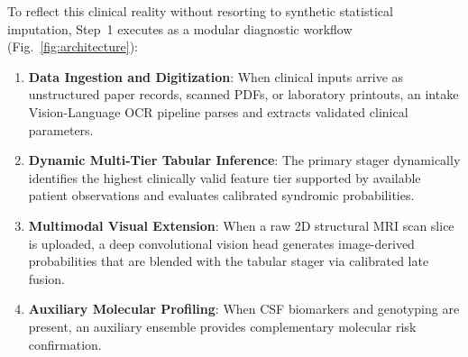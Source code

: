 To reflect this clinical reality without resorting to synthetic statistical imputation, Step~1 executes as a modular diagnostic workflow (Fig.~\ref{fig:architecture}):
\begin{enumerate}
    \item \textbf{Data Ingestion and Digitization}: When clinical inputs arrive as unstructured paper records, scanned PDFs, or laboratory printouts, an intake Vision-Language OCR pipeline parses and extracts validated clinical parameters.
    \item \textbf{Dynamic Multi-Tier Tabular Inference}: The primary stager dynamically identifies the highest clinically valid feature tier supported by available patient observations and evaluates calibrated syndromic probabilities.
    \item \textbf{Multimodal Visual Extension}: When a raw 2D structural MRI scan slice is uploaded, a deep convolutional vision head generates image-derived probabilities that are blended with the tabular stager via calibrated late fusion.
    \item \textbf{Auxiliary Molecular Profiling}: When CSF biomarkers and genotyping are present, an auxiliary ensemble provides complementary molecular risk confirmation.
\end{enumerate}

